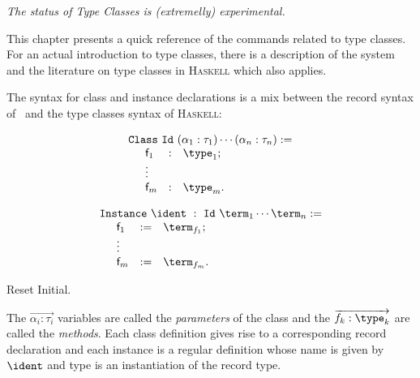 \def\Haskell{\textsc{Haskell}\xspace}
\def\eol{\setlength\parskip{0pt}\par}
\def\indent#1{\noindent\kern#1}
\def\cst#1{\textsf{#1}}
\def\tele#1{\overrightarrow{#1}}

\label{typeclasses}

\begin{flushleft}
  \em The status of Type Classes is (extremelly) experimental.
\end{flushleft}

This chapter presents a quick reference of the commands related to type
classes. For an actual introduction to type classes, there is a
description of the system \cite{sozeau08} and the literature on type
classes in \Haskell which also applies.

\label{ClassesInstances}

The syntax for class and instance declarations is a mix between the
record syntax of \Coq~and the type classes syntax of \Haskell:
\def\kw{\texttt}
\def\classid{\texttt}

\begin{center}
\[\begin{array}{l}
\kw{Class}~\classid{Id}~(\alpha_1 : \tau_1) \cdots (\alpha_n : \tau_n) :=\\
\begin{array}{p{0em}lcl}
  & \cst{f}_1 & : & \type_1 ; \\
  & \vdots & &  \\
  & \cst{f}_m & : & \type_m.
\end{array}\end{array}\]
\end{center}
\begin{center}
\[\begin{array}{l}
\kw{Instance}~\ident~:~\classid{Id}~\term_1 \cdots \term_n :=\\
\begin{array}{p{0em}lcl}
  & \cst{f}_1 & := & \term_{f_1} ; \\
  & \vdots & &  \\
  & \cst{f}_m & := & \term_{f_m}.
\end{array}\end{array}\]
\end{center}
\begin{coq_eval}
  Reset Initial.
\end{coq_eval}

The $\tele{\alpha_i : \tau_i}$ variables are called the \emph{parameters}
of the class and the $\tele{f_k : \type_k}$ are called the
\emph{methods}. Each class definition gives rise to a corresponding
record declaration and each instance is a regular definition whose name
is given by $\ident$ and type is an instantiation of the record type.

